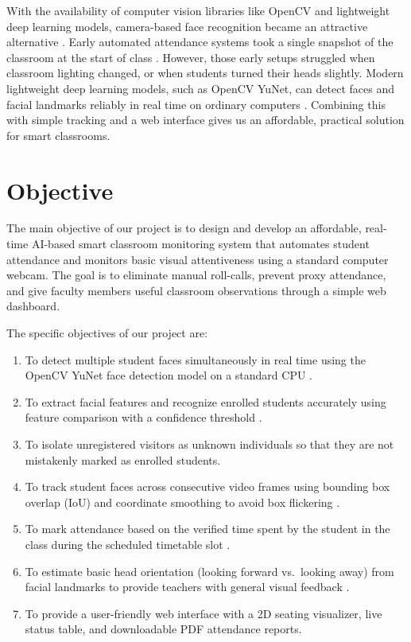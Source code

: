 \documentclass[10pt]{report}
\begin{document}
\hspace{0.5cm}With the availability of computer vision libraries like OpenCV and lightweight deep learning models, camera-based face recognition became an attractive alternative \cite{angulakshmi2024face, george2024edgeface}. Early automated attendance systems took a single snapshot of the classroom at the start of class \cite{raj2024facial}. However, those early setups struggled when classroom lighting changed, or when students turned their heads slightly. Modern lightweight deep learning models, such as OpenCV YuNet, can detect faces and facial landmarks reliably in real time on ordinary computers \cite{zhang2023realtime}. Combining this with simple tracking and a web interface gives us an affordable, practical solution for smart classrooms.

\section{Objective}
\hspace{0.5cm}The main objective of our project is to design and develop an affordable, real-time AI-based smart classroom monitoring system that automates student attendance and monitors basic visual attentiveness using a standard computer webcam. The goal is to eliminate manual roll-calls, prevent proxy attendance, and give faculty members useful classroom observations through a simple web dashboard.

\hspace{0.5cm}The specific objectives of our project are:
\begin{enumerate}[label=(\alph*)]
    \item To detect multiple student faces simultaneously in real time using the OpenCV YuNet face detection model on a standard CPU \cite{zhang2023realtime}.
    \item To extract facial features and recognize enrolled students accurately using feature comparison with a confidence threshold \cite{george2024edgeface}.
    \item To isolate unregistered visitors as unknown individuals so that they are not mistakenly marked as enrolled students.
    \item To track student faces across consecutive video frames using bounding box overlap (IoU) and coordinate smoothing to avoid box flickering \cite{zhu2023tracking}.
    \item To mark attendance based on the verified time spent by the student in the class during the scheduled timetable slot \cite{rajesh2023smart}.
    \item To estimate basic head orientation (looking forward vs.\ looking away) from facial landmarks to provide teachers with general visual feedback \cite{booth2023engagement, ghodekar2023activeness}.
    \item To provide a user-friendly web interface with a 2D seating visualizer, live status table, and downloadable PDF attendance reports.
\end{enumerate}
\end{document}
